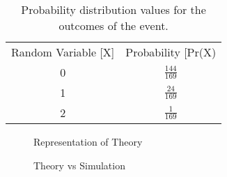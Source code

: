 \documentclass[journal,12pt,twocolumn]{IEEEtran}
\begin{document}
\begin{table}[H]
    \centering
        \begin{tabular}{|c|c|}
            \hline
            \multirow{2}{*}{\normalsize{Random Variable [X]}} &   \multirow{2}{*}{\normalsize{Probability [Pr(X)}}    \\
                                        &                                                \\\hline
            \multirow{2}{*}{\large{0}}  &   \multirow{2}{*}{\large{\(\frac{144}{169}\)}} \\
                                        &                                                \\\hline
            \multirow{2}{*}{\large{1}}  &   \multirow{2}{*}{\large{\(\frac{24}{169}\)}}  \\
                                        &                                                \\\hline
            \multirow{2}{*}{\large{2}}  &   \multirow{2}{*}{\large{\(\frac{1}{169}\)}}   \\
                                        &                                                \\\hline
    \end{tabular}
    \caption{Probability distribution values for the outcomes of the event.}
    \label{Probabilty Distribution Table}
\end{table}

\begin{figure}[H]
    \centering
    \caption{Representation of Theory}
    \label{Pie chart}
\end{figure}

\begin{figure}[H]
    \centering
    \caption{Theory vs Simulation}
    \label{Bar Chart}
\end{figure}
\end{document}
